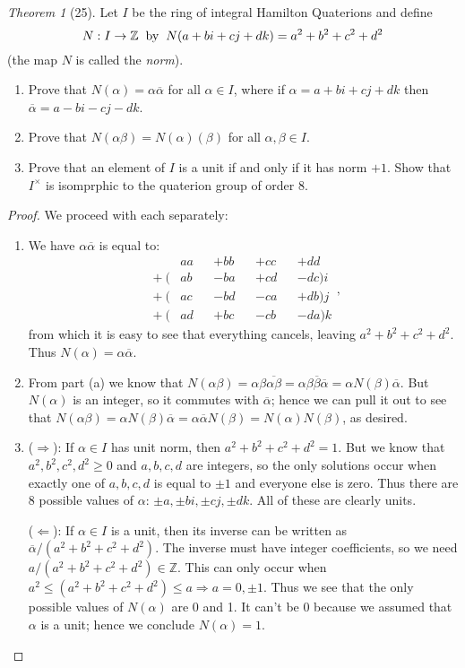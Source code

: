 \documentclass[12pt]{article}
\theoremstyle{remark}
\theoremstyle{named}
\newtheorem*{theorem}{Theorem}
\renewcommand{\a}{\alpha}
\renewcommand{\b}{\beta}
\newcommand{\Z}{\mathbb Z}
\begin{document}
\begin{theorem}[25]
    Let \(I\) be the ring of integral Hamilton Quaterions and define 
    \[N : I \to \Z \hspace{2mm} \text{by} \hspace{2mm} N(a + bi + cj + dk) = a^2 + b^2 + c^2 + d^2\]
    (the map \(N\) is called the \textit{norm}).
    \begin{enumerate}
        \item Prove that \(N(\alpha) = \alpha\overline{\alpha}\) for all \(\alpha \in I\), where if \(\alpha = a + bi + cj + dk\) then \(\overline{\alpha} = a - bi - cj - dk\).
        \item Prove that \(N(\alpha\beta) = N(\alpha)(\beta)\) for all \(\a, \b \in I\).
        \item Prove that an element of \(I\) is a unit if and only if it has norm \(+1\). Show that \(I^\times\) is isomprphic to the quaterion group of order 8.
    \end{enumerate}
\end{theorem}

\begin{proof}
    We proceed with each separately:
    \begin{enumerate}
        \item We have $\a \overline{\a}$ is equal to:
        $${\displaystyle {
        \begin{alignedat}{4}
        &aa&&+bb&&+cc&&+dd\\
        {}+{}(&ab&&-ba&&+cd&&-dc) {i} \\
        {}+{}(&ac&&-bd&&-ca&&+db) {j} \\
        {}+{}(&ad&&+bc&&-cb&&-da) {k} 
        \end{alignedat}}},$$
        from which it is easy to see that everything cancels, leaving $a^2 + b^2 + c^2 + d^2$. Thus $N(\a) = \a \overline{\a}$.
        \item From part (a) we know that $N(\a\b) = \a \b \overline{\a\b} = \a\b \overline{\b} \overline{\a} = \a N(\b) \overline{\a}$. But $N(\a)$ is an integer, so it commutes with $\overline{\a}$; hence we can pull it out to see that $N(\a\b) = \a N(\b) \overline{\a} = \a \overline{\a} N(\b) = N(\a) N(\b)$, as desired.
        \item ($\Rightarrow$): If $\a \in I$ has unit norm, then $a^2 + b^2 + c^2 + d^2 = 1$. But we know that $a^2, b^2, c^2, d^2 \ge 0$ and $a, b, c, d$ are integers, so the only solutions occur when exactly one of $a, b, c, d$ is equal to $\pm 1$ and everyone else is zero. Thus there are 8 possible values of $\a$: $\pm a, \pm bi, \pm cj, \pm dk$. All of these are clearly units.
        
        ($\Leftarrow$): If $\a \in I$ is a unit, then its inverse can be written as $ \overline{\a} / (a^2 + b^2 + c^2 + d^2)$. The inverse must have integer coefficients, so we need $a / (a^2 + b^2 + c^2 + d^2) \in \Z$. This can only occur when $a^2 \le (a^2 + b^2 + c^2 + d^2) \le a \Rightarrow a = 0, \pm 1$. Thus we see that the only possible values of $N(\a)$ are 0 and 1. It can't be 0 because we assumed that $\a$ is a unit; hence we conclude $N(\a) = 1$.
    \end{enumerate}
\end{proof}
\end{document}
